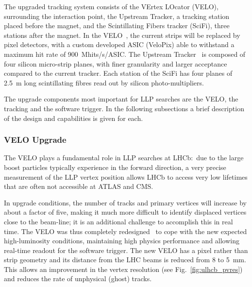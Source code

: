 The upgraded tracking system consists of the VErtex LOcator (VELO), surrounding the interaction point, the Upstream Tracker, a tracking station placed before the magnet, and the Scintillating Fibers tracker (SciFi), three stations after the magnet. In the VELO~\cite{LHCb-TDR-013}, the current strips will be replaced by pixel detectors, with a custom developed ASIC (VeloPix) able to withstand a maximum hit rate of 900~Mhits/s/ASIC. The Upstream Tracker~\cite{LHCb-TDR-015} is composed of four silicon micro-strip planes, with finer granularity and larger acceptance compared to the current tracker. Each station of the SciFi has four planes of 2.5~m long scintillating fibres read out by silicon photo-multipliers.

The upgrade components most important for LLP searches are the VELO, the tracking and the software trigger. In the following subsections a brief description of the design and capabilities is given for each.

\subsubsection{VELO Upgrade}

The VELO plays a fundamental role in LLP searches at LHCb:~due to the large boost particles typically experience in the forward direction, a very precise measurement of the LLP vertex position allows LHCb to access very low lifetimes that are often not accessible at ATLAS and CMS.

In upgrade conditions, the number of tracks and primary vertices will increase by about a factor of five, making it much more difficult to identify displaced vertices close to the beam-line; it is an additional challenge to accomplish this in real time. The VELO was thus completely redesigned~\cite{LHCb-TDR-013} to cope with the new expected high-luminosity conditions, maintaining high physics performance and allowing real-time readout for the software trigger. The new VELO has a pixel rather than strip geometry and its distance from the LHC beams is reduced from 8 to 5~mm. This allows an improvement in the vertex resolution (see Fig.~\ref{fig:ulhcb_pvres}) and reduces the rate of unphysical (ghost) tracks.

